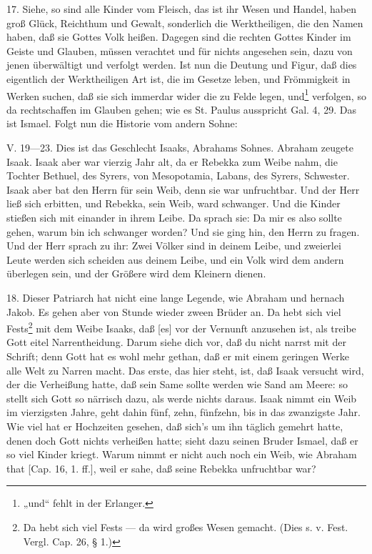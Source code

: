 17. Siehe, so sind alle Kinder vom Fleisch, das ist ihr Wesen und Handel, haben groß Glück,
Reichthum und Gewalt, sonderlich die Werktheiligen, die den Namen haben, daß sie Gottes Volk heißen. Dagegen sind die rechten Gottes Kinder im Geiste und Glauben, müssen verachtet und für nichts angesehen sein, dazu von jenen überwältigt und verfolgt werden. Ist nun die Deutung und Figur, daß dies eigentlich der Werktheiligen Art ist, die im Gesetze leben, und Frömmigkeit in Werken suchen, daß sie sich immerdar wider die zu Felde legen, und\footnote{„und“ fehlt in der Erlanger.} verfolgen, so da rechtschaffen im Glauben gehen; wie es St. Paulus ausspricht Gal. 4, 29. Das ist Ismael. Folgt nun die Historie vom andern Sohne:

V. 19—23. Dies ist das Geschlecht Isaaks, Abrahams Sohnes. Abraham zeugete Isaak. Isaak aber war vierzig Jahr alt, da er Rebekka zum Weibe nahm, die Tochter Bethuel, des Syrers, von Mesopotamia, Labans, des Syrers, Schwester. Isaak aber bat den Herrn für sein Weib, denn sie war unfruchtbar. Und der Herr ließ sich erbitten, und Rebekka, sein Weib, ward schwanger. Und die Kinder stießen sich mit einander in ihrem Leibe. Da sprach sie: Da mir es also sollte gehen, warum bin ich schwanger worden? Und sie ging hin, den Herrn zu fragen. Und der Herr sprach zu ihr: Zwei Völker sind in deinem Leibe, und zweierlei Leute werden sich scheiden aus deinem Leibe, und ein Volk wird dem andern überlegen sein, und der Größere wird dem Kleinern dienen.

18. Dieser Patriarch hat nicht eine lange Legende, wie Abraham und hernach Jakob. Es gehen aber von Stunde wieder zween Brüder an. Da hebt sich viel Fests\footnote{Da hebt sich viel Fests — da wird großes Wesen gemacht. (Dies s. v. Fest. Vergl. Cap. 26, § 1.)} mit dem Weibe Isaaks, daß [es] vor der Vernunft anzusehen ist, als treibe Gott eitel Narrentheidung. Darum siehe dich vor, daß du nicht narrst mit der Schrift; denn Gott hat es wohl mehr gethan, daß er mit einem geringen Werke alle Welt zu Narren macht. Das erste, das hier steht, ist, daß Isaak versucht wird, der die Verheißung hatte, daß sein Same sollte werden wie Sand am Meere: so stellt sich Gott so närrisch dazu, als werde nichts daraus. Isaak nimmt ein Weib im vierzigsten Jahre, geht dahin fünf, zehn, fünfzehn, bis in das zwanzigste Jahr. Wie viel hat er Hochzeiten gesehen, daß sich’s um ihn täglich gemehrt hatte, denen doch Gott nichts verheißen hatte; sieht dazu seinen Bruder Ismael, daß er so viel Kinder kriegt. Warum nimmt er nicht auch noch ein Weib, wie Abraham that [Cap. 16, 1. ff.], weil er sahe, daß seine Rebekka unfruchtbar war?

